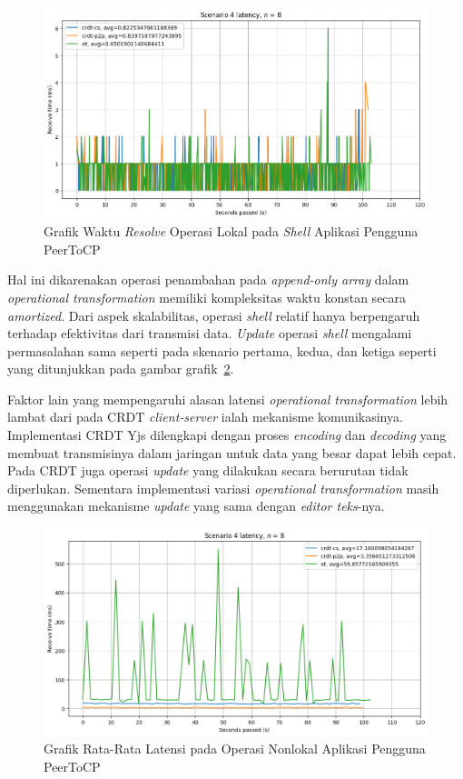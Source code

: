 \begin{figure}
 \centering
 \includegraphics[width=15cm]{./assets/skripsi/benchmark-vis_cell_13_output_5}
 \caption{Grafik Waktu \textit{Resolve} Operasi Lokal pada \textit{Shell} Aplikasi Pengguna PeerToCP}
 \label{fig:13-5}
\end{figure}

Hal ini dikarenakan operasi penambahan pada \textit{append-only array} dalam \textit{operational transformation} memiliki kompleksitas waktu konstan secara \textit{amortized}. Dari aspek skalabilitas, operasi \textit{shell} relatif hanya berpengaruh terhadap efektivitas dari transmisi data. \textit{Update} operasi \textit{shell} mengalami permasalahan sama seperti pada skenario pertama, kedua, dan ketiga seperti yang ditunjukkan pada gambar grafik~\ref{fig:9-5}.

Faktor lain yang mempengaruhi alasan latensi \textit{operational transformation} lebih lambat dari pada CRDT \textit{client-server} ialah mekanisme komunikasinya. Implementasi CRDT Yjs dilengkapi dengan proses \textit{encoding} dan \textit{decoding} yang membuat transmisinya dalam jaringan untuk data yang besar dapat lebih cepat. Pada CRDT juga operasi \textit{update} yang dilakukan secara berurutan tidak diperlukan. Sementara implementasi variasi \textit{operational transformation} masih menggunakan mekanisme \textit{update} yang sama dengan \textit{editor teks}-nya.

\begin{figure}
 \centering
 \includegraphics[width=15cm]{./assets/skripsi/benchmark-vis_cell_9_output_5}
 \caption{Grafik Rata-Rata Latensi pada Operasi Nonlokal Aplikasi Pengguna PeerToCP}
 \label{fig:9-5}
\end{figure}

